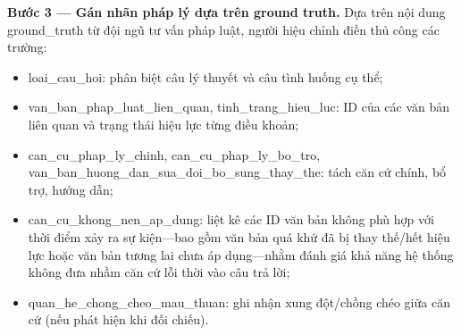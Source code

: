 \documentclass[../DoAn.tex]{subfiles}
\begin{document}
\textbf{Bước 3 --- Gán nhãn pháp lý dựa trên ground truth.}
Dựa trên nội dung ground\_truth từ đội ngũ tư vấn pháp luật, người hiệu chỉnh điền thủ công các trường:
\begin{itemize}
    \item loai\_cau\_hoi: phân biệt câu lý thuyết và câu tình huống cụ thể;
    \item van\_ban\_phap\_luat\_lien\_quan, tinh\_trang\_hieu\_luc: ID của các văn bản liên quan và trạng thái hiệu lực từng điều khoản;
    \item can\_cu\_phap\_ly\_chinh, can\_cu\_phap\_ly\_bo\_tro, \\ van\_ban\_huong\_dan\_sua\_doi\_bo\_sung\_thay\_the: tách căn cứ chính, bổ trợ, hướng dẫn;
    \item can\_cu\_khong\_nen\_ap\_dung: liệt kê các ID văn bản không phù hợp với thời điểm xảy ra sự kiện---bao gồm văn bản quá khứ đã bị thay thế/hết hiệu lực hoặc văn bản tương lai chưa áp dụng---nhằm đánh giá khả năng hệ thống không đưa nhầm căn cứ lỗi thời vào câu trả lời;
    \item quan\_he\_chong\_cheo\_mau\_thuan: ghi nhận xung đột/chồng chéo giữa căn cứ (nếu phát hiện khi đối chiếu).
\end{itemize}


\end{document}
